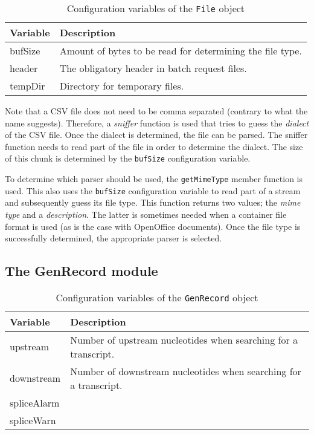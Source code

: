 \documentclass{article}
\begin{document}
\begin{table}[H]
\begin{center}
\begin{tabular}{l|l}
Variable & Description \\
\hline
bufSize  & Amount of bytes to be read for determining the file type. \\
header   & The obligatory header in batch request files. \\
tempDir  & Directory for temporary files.
\end{tabular}
\caption{Configuration variables of the \texttt{File} object}
\label{tab:fileconfig}
\end{center}
\end{table}

Note that a CSV file does not need to be comma separated (contrary to what the
name suggests). Therefore, a \emph{sniffer} function is used that tries to
guess the \emph{dialect} of the CSV file. Once the dialect is determined, the
file can be parsed. The sniffer function needs to read part of the file in
order to determine the dialect. The size of this chunk is determined by the
\texttt{bufSize} configuration variable.

To determine which parser should be used, the \texttt{getMimeType} member
function is used. This also uses the \texttt{bufSize} configuration variable to
read part of a stream and subsequently guess its file type. This function
returns two values; the \emph{mime type} and a \emph{description}. The latter
is sometimes needed when a container file format is used (as is the case with
OpenOffice documents). Once the file type is successfully determined, the
appropriate parser is selected.

\subsection{The GenRecord module} \label{subsec:genrecord}

\begin{table}[H]
\begin{center}
\begin{tabular}{l|p{9cm}}
Variable    & Description \\
\hline
upstream    & Number of upstream nucleotides when searching for a
              transcript. \\
downstream  & Number of downstream nucleotides when searching for a
              transcript. \\
spliceAlarm & \\
spliceWarn  &
\end{tabular}
\caption{Configuration variables of the \texttt{GenRecord} object}
\label{tab:genrecordconfig}
\end{center}
\end{table}
\end{document}
